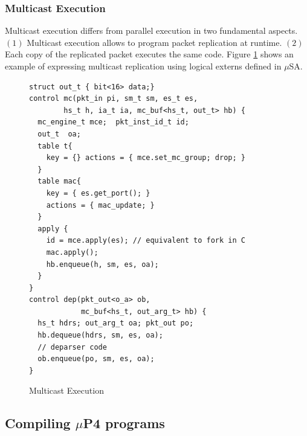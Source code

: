\subsubsection{Multicast Execution}
\label{subsubsection:multicast-execution}
Multicast execution differs from parallel execution in two fundamental aspects.
$(1)$ Multicast execution allows to program packet replication at runtime.
$(2)$ Each copy of the replicated packet executes the same code.
Figure \ref{fig:multicast-execution} shows an example of expressing multicast replication using logical externs defined in $\mu$SA.
\begin{figure}[ht]
\begin{lstlisting}[frame=none]
struct out_t { bit<16> data;}
control mc(pkt_in pi, sm_t sm, es_t es, 
        hs_t h, ia_t ia, mc_buf<hs_t, out_t> hb) {
  mc_engine_t mce;  pkt_inst_id_t id; 
  out_t  oa;
  table t{
    key = {} actions = { mce.set_mc_group; drop; }
  }
  table mac{
    key = { es.get_port(); } 
    actions = { mac_update; }
  }
  apply {
    id = mce.apply(es); // equivalent to fork in C
    mac.apply();
    hb.enqueue(h, sm, es, oa);
  }
}
control dep(pkt_out<o_a> ob, 
            mc_buf<hs_t, out_arg_t> hb) {
  hs_t hdrs; out_arg_t oa; pkt_out po;
  hb.dequeue(hdrs, sm, es, oa);
  // deparser code 
  ob.enqueue(po, sm, es, oa);
}
\end{lstlisting}
\caption{Multicast Execution}
\label{fig:multicast-execution}
\end{figure}

\subsection{Compiling $\mu$P4 programs}






